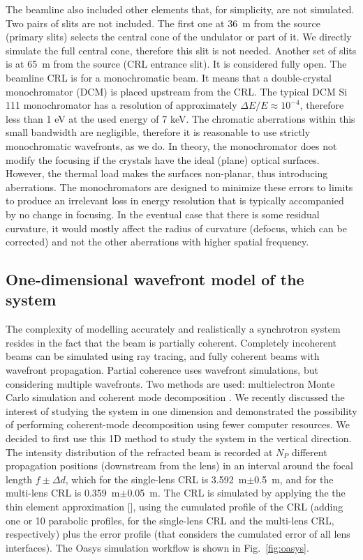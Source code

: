 \documentclass{iucr}
\newcommand{\inred}[1]{{\color{black}#1}}
\begin{document}
 \inred{The beamline also included other elements that, for simplicity, are not simulated. Two pairs of slits are not included. The first one at \SI{36}{\meter} from the source (primary slits) selects the central cone of the undulator or part of it. We directly simulate the full central cone, therefore this slit is not needed. Another set of slits is at \SI{65}{\meter} from the source (CRL entrance slit). It is considered fully open.
 The beamline CRL is for a monochromatic beam. It means that a double-crystal monochromator (DCM) is placed upstream from the CRL.
 The typical DCM Si 111 monochromator has a resolution of approximately $\Delta E/E \approx 10^{-4}$, therefore less than 1 eV at the used energy of 7 keV. The chromatic aberrations within this small bandwidth are negligible, therefore it is reasonable to use strictly monochromatic wavefronts, as we do. In theory, the monochromator does not modify the focusing if the crystals have the ideal (plane) optical surfaces. However, the thermal load makes the surfaces non-planar, thus introducing aberrations. The monochromators are designed to minimize these errors to limits to produce an irrelevant loss in energy resolution that is typically accompanied by no change in focusing. In the eventual case that there is some residual curvature, it would mostly affect the radius of curvature (defocus, which can be corrected) and not the other aberrations with higher spatial frequency.
 }

\subsection{One-dimensional wavefront model of the system}\label{sec:1Dmodel}
The complexity of modelling accurately and realistically a synchrotron system resides in the fact that the beam is partially coherent. Completely incoherent beams can be simulated using ray tracing, and fully coherent beams with wavefront propagation. Partial coherence uses wavefront simulations, but considering multiple wavefronts. Two methods are used: multielectron Monte Carlo simulation \cite{codeSRW_ME} and coherent mode decomposition \cite{Glass2017}. We recently discussed the interest of studying the system in one dimension and demonstrated the possibility of performing coherent-mode decomposition \cite{multioptics}  using fewer computer resources. We decided to first use this 1D method to study the system in the vertical direction. 
The intensity distribution of the refracted beam is recorded at $N_P$ different propagation positions (downstream from the lens) in an interval around the focal length $f\pm\Delta d$, which for the single-lens CRL is \SI{3.592}{\meter}$\pm$\SI{0.5}{\meter}, and for the multi-lens CRL is \SI{0.359}{\meter}$\pm$\SI{0.05}{\meter}.
The CRL is simulated by applying the the thin element approximation \inred{[\cite{Celestre2020, multioptics}]}, using the cumulated profile of the CRL (adding one or 10 parabolic profiles, for the single-lens CRL and the multi-lens CRL, respectively) plus the error profile (that considers the cumulated error of all lens interfaces).
The Oasys \cite{codeOASYS} simulation workflow is shown in Fig.~\ref{fig:oasys}. 
\end{document}
